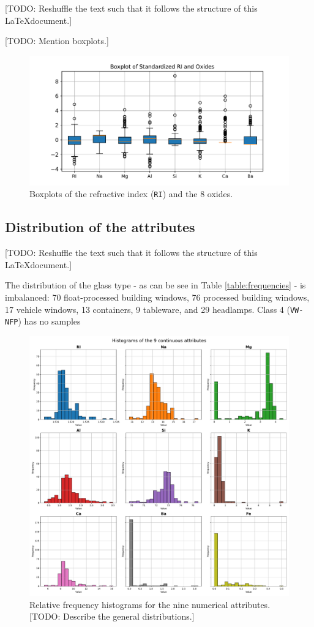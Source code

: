 \documentclass[dtu]{dtuarticle}
\newcommand{\todo}[1]{\color{red}[TODO: #1]\color{black}}
\begin{document}
	\todo{Reshuffle the text such that it follows the structure of this \LaTeX document.}

	\todo{Mention boxplots.}

	\begin{figure}
		\centering
		\includegraphics[width=.8\textwidth]{figures/boxplots}
		\caption{Boxplots of the refractive index (\texttt{RI}) and the 8 oxides.}
		\label{fig:boxplots}
	\end{figure}

	\subsection{Distribution of the attributes}

	\todo{Reshuffle the text such that it follows the structure of this \LaTeX document.}

	The distribution of the glass type - as can be see in Table \ref{table:frequencies} - is imbalanced: 70 float-processed building windows, 76 processed building windows, 17 vehicle windows, 13 containers, 9 tableware, and 29 headlamps. Class 4 (\texttt{VW-NFP}) has no samples

	\label{section:distribution}

	\begin{figure}
		\centering
		\includegraphics[width=.8\textwidth]{figures/histograms}
		\caption{Relative frequency histograms for the nine numerical attributes. \todo{Describe the general distributions.}}
		\label{fig:histograms}
	\end{figure}
\end{document}
